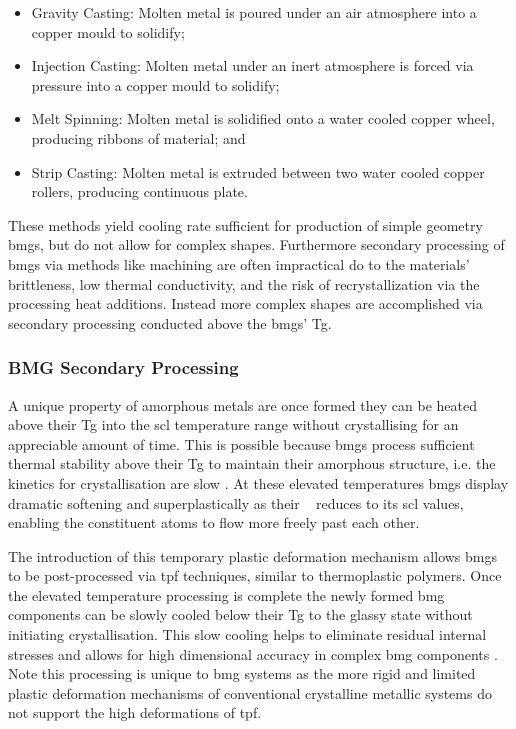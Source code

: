 \documentclass[a4paper,12pt,oneside]{report}%
\begin{document}
\begin{itemize}
	\item Gravity Casting: Molten metal is poured under an air  atmosphere into a copper mould to solidify;
	\item Injection Casting: Molten metal under an inert atmosphere is forced via pressure into a copper mould to solidify;
	\item Melt Spinning: Molten metal is solidified onto a water cooled copper wheel, producing ribbons of material; and
	\item Strip Casting: Molten metal is extruded between two water cooled copper rollers, producing continuous plate. 
\end{itemize}

These methods yield cooling rate sufficient for production of simple geometry \glspl{bmg}, but do not allow for complex shapes. Furthermore secondary processing of \glspl{bmg} via methods like machining are often impractical do to the materials' brittleness, low thermal conductivity, and the risk of recrystallization via the processing heat additions. Instead more complex shapes are accomplished via secondary processing conducted above the \glspl{bmg}' \gls{Tg}. 

\subsubsection{BMG Secondary Processing}
A unique property of amorphous metals are once formed they can be heated above their \gls{Tg} into the \gls{scl} temperature range without crystallising for an appreciable amount of time. This is possible because \glspl{bmg} process sufficient thermal stability above their \gls{Tg} to maintain their amorphous structure, i.e. the kinetics for crystallisation are slow \cite{Schroers2010}. At these elevated temperatures \glspl{bmg} display dramatic softening and superplastically as their \n~ reduces to its \gls{scl} values, enabling the constituent atoms to flow more freely past each other. 

The introduction of this temporary plastic deformation mechanism allows \glspl{bmg} to be post-processed via \gls{tpf} techniques, similar to thermoplastic polymers. Once the elevated temperature processing is complete the newly formed \gls{bmg} components can be slowly cooled below their \gls{Tg} to the glassy state without initiating crystallisation. This slow cooling helps to eliminate residual internal stresses and allows for high dimensional accuracy in complex \gls{bmg} components \cite{Schroers2010}. Note this processing is unique to \gls{bmg} systems as the more rigid and limited plastic deformation mechanisms of conventional crystalline metallic systems do not support the high deformations of \gls{tpf}.
\end{document}
